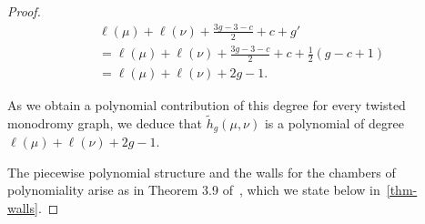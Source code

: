 \begin{proof}
\begin{align*}
&\ell(\mu)+\ell(\nu)+\frac{3g-3-c}{2}+c+g'
\\&= \ell(\mu)+\ell(\nu)+\frac{3g-3-c}{2}+c+\frac{1}{2}(g-c+1)
\\&= \ell(\mu)+\ell(\nu)+2g-1.
\end{align*}

As we obtain a polynomial contribution of this degree for every twisted monodromy graph, we deduce that $\tilde{h}_g(\mu,\nu)$ is a polynomial of degree $\ell(\mu)+\ell(\nu)+2g-1$. 

The piecewise polynomial structure and the walls for the chambers of polynomiality arise as in Theorem 3.9 of~\cite{CJM11}, which we state below in~\cref{thm-walls}.
\end{proof}
